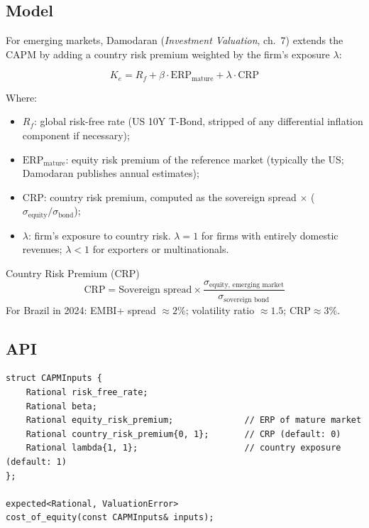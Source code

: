 \documentclass[12pt, a4paper, oneside]{book}
\newcommand{\ERP}{\ensuremath{\mathrm{ERP}}}
\newcommand{\CRP}{\ensuremath{\mathrm{CRP}}}
\newcommand{\Ke}{K_e}
\newcommand{\Rf}{R_f}
\begin{document}
\subsection{Model}

For emerging markets, Damodaran (\textit{Investment Valuation}, ch.~7)
extends the CAPM by adding a country risk premium weighted by the firm's
exposure $\lambda$:

\begin{equation}
  \Ke = \Rf + \beta \cdot \ERP_{\text{mature}} + \lambda \cdot \CRP
  \label{eq:capm_crp}
\end{equation}

Where:
\begin{itemize}
  \item $\Rf$: global risk-free rate (US 10Y T-Bond, stripped of any
        differential inflation component if necessary);
  \item $\ERP_{\text{mature}}$: equity risk premium of the reference market
        (typically the US; Damodaran publishes annual estimates);
  \item $\CRP$: country risk premium, computed as the sovereign spread
        $\times$ ($\sigma_{\text{equity}} / \sigma_{\text{bond}}$);
  \item $\lambda$: firm's exposure to country risk.
        $\lambda = 1$ for firms with entirely domestic revenues;
        $\lambda < 1$ for exporters or multinationals.
\end{itemize}

\begin{definition}{Country Risk Premium (CRP)}
  \[
    \CRP = \text{Sovereign spread} \times
           \frac{\sigma_{\text{equity, emerging market}}}
                {\sigma_{\text{sovereign bond}}}
  \]
  For Brazil in 2024: EMBI+ spread $\approx 2\%$;
  volatility ratio $\approx 1.5$; $\CRP \approx 3\%$.
\end{definition}

\subsection{API}

\begin{lstlisting}[style=cpp]
struct CAPMInputs {
    Rational risk_free_rate;
    Rational beta;
    Rational equity_risk_premium;              // ERP of mature market
    Rational country_risk_premium{0, 1};       // CRP (default: 0)
    Rational lambda{1, 1};                     // country exposure (default: 1)
};

expected<Rational, ValuationError>
cost_of_equity(const CAPMInputs& inputs);
\end{lstlisting}
\end{document}
